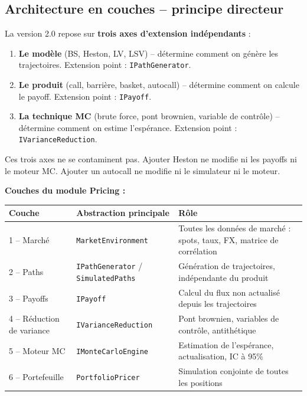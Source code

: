 \documentclass[a4paper,11pt]{article}
\newcommand{\cs}[1]{\texttt{\color{codeinline}#1}}
\begin{document}
\subsection{Architecture en couches -- principe directeur}

La version 2.0 repose sur \textbf{trois axes d'extension ind\'ependants} :

\begin{enumerate}[leftmargin=1.5em]
  \item \textbf{Le mod\`ele} (BS, Heston, LV, LSV) -- d\'etermine comment on g\'en\`ere les
        trajectoires. Extension point : \cs{IPathGenerator}.
  \item \textbf{Le produit} (call, barri\`ere, basket, autocall) -- d\'etermine comment
        on calcule le payoff. Extension point : \cs{IPayoff}.
  \item \textbf{La technique MC} (brute force, pont brownien, variable de contr\^ole) --
        d\'etermine comment on estime l'esp\'erance. Extension point : \cs{IVarianceReduction}.
\end{enumerate}

Ces trois axes ne se contaminent pas. Ajouter Heston ne modifie ni les payoffs ni
le moteur MC. Ajouter un autocall ne modifie ni le simulateur ni le moteur.

\textbf{Couches du module Pricing :}

\begin{center}
\begin{tabularx}{\textwidth}{l l X}
\toprule
\textbf{Couche} & \textbf{Abstraction principale} & \textbf{R\^ole} \\
\midrule
1 -- March\'e & \cs{MarketEnvironment} & Toutes les donn\'ees de march\'e : spots, taux, FX, matrice de corr\'elation \\
2 -- Paths & \cs{IPathGenerator} / \cs{SimulatedPaths} & G\'en\'eration de trajectoires, ind\'ependante du produit \\
3 -- Payoffs & \cs{IPayoff} & Calcul du flux non actualis\'e depuis les trajectoires \\
4 -- R\'eduction de variance & \cs{IVarianceReduction} & Pont brownien, variables de contr\^ole, antith\'etique \\
5 -- Moteur MC & \cs{IMonteCarloEngine} & Estimation de l'esp\'erance, actualisation, IC \`a 95\% \\
6 -- Portefeuille & \cs{PortfolioPricer} & Simulation conjointe de toutes les positions \\
\bottomrule
\end{tabularx}
\end{center}
\end{document}
